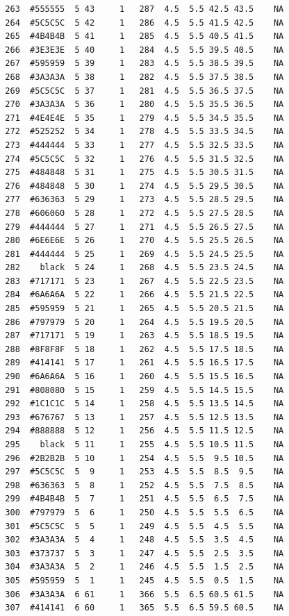 \documentclass[12pt,twoside]{reedthesis}
\begin{document}
\begin{verbatim}
  263  #555555  5 43     1   287  4.5  5.5 42.5 43.5    NA
  264  #5C5C5C  5 42     1   286  4.5  5.5 41.5 42.5    NA
  265  #4B4B4B  5 41     1   285  4.5  5.5 40.5 41.5    NA
  266  #3E3E3E  5 40     1   284  4.5  5.5 39.5 40.5    NA
  267  #595959  5 39     1   283  4.5  5.5 38.5 39.5    NA
  268  #3A3A3A  5 38     1   282  4.5  5.5 37.5 38.5    NA
  269  #5C5C5C  5 37     1   281  4.5  5.5 36.5 37.5    NA
  270  #3A3A3A  5 36     1   280  4.5  5.5 35.5 36.5    NA
  271  #4E4E4E  5 35     1   279  4.5  5.5 34.5 35.5    NA
  272  #525252  5 34     1   278  4.5  5.5 33.5 34.5    NA
  273  #444444  5 33     1   277  4.5  5.5 32.5 33.5    NA
  274  #5C5C5C  5 32     1   276  4.5  5.5 31.5 32.5    NA
  275  #484848  5 31     1   275  4.5  5.5 30.5 31.5    NA
  276  #484848  5 30     1   274  4.5  5.5 29.5 30.5    NA
  277  #636363  5 29     1   273  4.5  5.5 28.5 29.5    NA
  278  #606060  5 28     1   272  4.5  5.5 27.5 28.5    NA
  279  #444444  5 27     1   271  4.5  5.5 26.5 27.5    NA
  280  #6E6E6E  5 26     1   270  4.5  5.5 25.5 26.5    NA
  281  #444444  5 25     1   269  4.5  5.5 24.5 25.5    NA
  282    black  5 24     1   268  4.5  5.5 23.5 24.5    NA
  283  #717171  5 23     1   267  4.5  5.5 22.5 23.5    NA
  284  #6A6A6A  5 22     1   266  4.5  5.5 21.5 22.5    NA
  285  #595959  5 21     1   265  4.5  5.5 20.5 21.5    NA
  286  #797979  5 20     1   264  4.5  5.5 19.5 20.5    NA
  287  #717171  5 19     1   263  4.5  5.5 18.5 19.5    NA
  288  #8F8F8F  5 18     1   262  4.5  5.5 17.5 18.5    NA
  289  #414141  5 17     1   261  4.5  5.5 16.5 17.5    NA
  290  #6A6A6A  5 16     1   260  4.5  5.5 15.5 16.5    NA
  291  #808080  5 15     1   259  4.5  5.5 14.5 15.5    NA
  292  #1C1C1C  5 14     1   258  4.5  5.5 13.5 14.5    NA
  293  #676767  5 13     1   257  4.5  5.5 12.5 13.5    NA
  294  #888888  5 12     1   256  4.5  5.5 11.5 12.5    NA
  295    black  5 11     1   255  4.5  5.5 10.5 11.5    NA
  296  #2B2B2B  5 10     1   254  4.5  5.5  9.5 10.5    NA
  297  #5C5C5C  5  9     1   253  4.5  5.5  8.5  9.5    NA
  298  #636363  5  8     1   252  4.5  5.5  7.5  8.5    NA
  299  #4B4B4B  5  7     1   251  4.5  5.5  6.5  7.5    NA
  300  #797979  5  6     1   250  4.5  5.5  5.5  6.5    NA
  301  #5C5C5C  5  5     1   249  4.5  5.5  4.5  5.5    NA
  302  #3A3A3A  5  4     1   248  4.5  5.5  3.5  4.5    NA
  303  #373737  5  3     1   247  4.5  5.5  2.5  3.5    NA
  304  #3A3A3A  5  2     1   246  4.5  5.5  1.5  2.5    NA
  305  #595959  5  1     1   245  4.5  5.5  0.5  1.5    NA
  306  #3A3A3A  6 61     1   366  5.5  6.5 60.5 61.5    NA
  307  #414141  6 60     1   365  5.5  6.5 59.5 60.5    NA

\end{verbatim}
\end{document}

